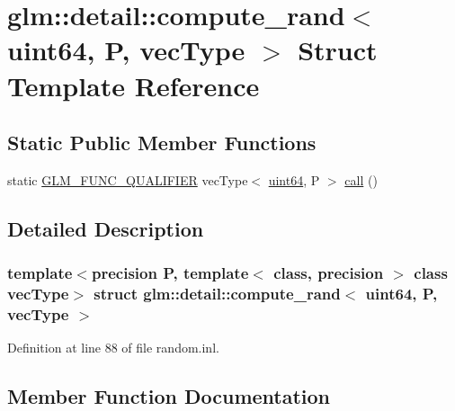 \hypertarget{structglm_1_1detail_1_1compute__rand_3_01uint64_00_01_p_00_01vec_type_01_4}{}\section{glm\+::detail\+::compute\+\_\+rand$<$ uint64, P, vec\+Type $>$ Struct Template Reference}
\label{structglm_1_1detail_1_1compute__rand_3_01uint64_00_01_p_00_01vec_type_01_4}
\subsection*{Static Public Member Functions}
\begin{DoxyCompactItemize}
\item 
static \mbox{\hyperlink{setup_8hpp_a33fdea6f91c5f834105f7415e2a64407}{G\+L\+M\+\_\+\+F\+U\+N\+C\+\_\+\+Q\+U\+A\+L\+I\+F\+I\+ER}} vec\+Type$<$ \mbox{\hyperlink{namespaceglm_1_1detail_adec4b19bf4982125e122db2fe03c5810}{uint64}}, P $>$ \mbox{\hyperlink{structglm_1_1detail_1_1compute__rand_3_01uint64_00_01_p_00_01vec_type_01_4_aaee716157dba6c26ee7bb5d176f5d68f}{call}} ()
\end{DoxyCompactItemize}


\subsection{Detailed Description}
\subsubsection*{template$<$precision P, template$<$ class, precision $>$ class vec\+Type$>$\newline
struct glm\+::detail\+::compute\+\_\+rand$<$ uint64, P, vec\+Type $>$}



Definition at line 88 of file random.\+inl.



\subsection{Member Function Documentation}
\mbox{\label{structglm_1_1detail_1_1compute__rand_3_01uint64_00_01_p_00_01vec_type_01_4_aaee716157dba6c26ee7bb5d176f5d68f}} 
